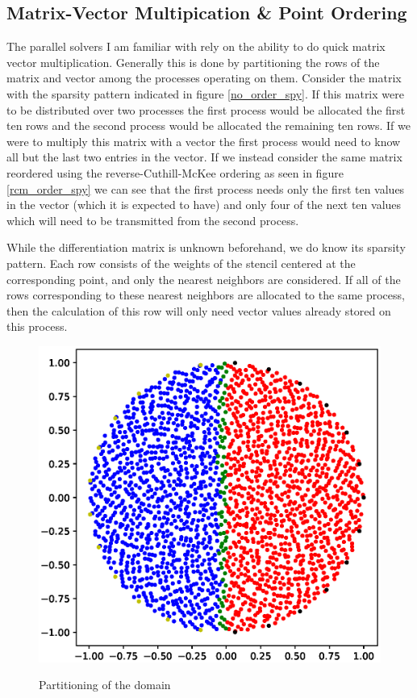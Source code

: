 \documentclass[12pt]{article}
\begin{document}
\subsection{Matrix-Vector Multipication \& Point Ordering}
	The parallel solvers I am familiar with rely on the ability to do quick matrix vector multiplication. Generally this is done by partitioning the rows of the matrix and vector among the processes operating on them. Consider the matrix with the sparsity pattern indicated in figure \ref{no_order_spy}. If this matrix were to be distributed over two processes the first process would be allocated the first ten rows and the second process would be allocated the remaining ten rows. If we were to multiply this matrix with a vector the first process would need to know all but the last two entries in the vector. If we instead consider the same matrix reordered using the reverse-Cuthill-McKee ordering as seen in figure \ref{rcm_order_spy} we can see that the first process needs only the first ten values in the vector (which it is expected to have) and only four of the next ten values which will need to be transmitted from the second process.
	
	While the differentiation matrix is unknown beforehand, we do know its sparsity pattern. Each row consists of the weights of the stencil centered at the corresponding point, and only the nearest neighbors are considered. If all of the rows corresponding to these nearest neighbors are allocated to the same process, then the calculation of this row will only need vector values already stored on this process. 
	
	\begin{figure}[ht]
		\centering
		\includegraphics[width=.75\textwidth]{nearest_2proc_disk.eps}
		\label{nearest_2proc_disk}
		\caption{Partitioning of the domain }
	\end{figure}
	
\end{document}
